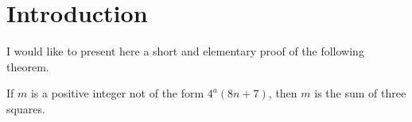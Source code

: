 %

\chapter*{Introduction}
I would like to present here a short and elementary proof of the following theorem.

\begin{theorem}\label{thm:sum-three-squares}
\leanok
If $m$ is a positive integer not of the form $4^{a}(8n+7)$, then $m$ is the sum of three squares.
\end{theorem}

